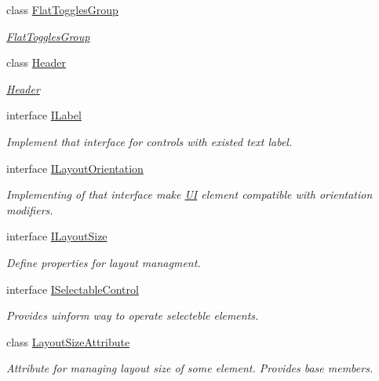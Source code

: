 \begin{DoxyCompactItemize}
class \mbox{\hyperlink{class_wpf_handler_1_1_u_i_1_1_controls_1_1_flat_toggles_group}{Flat\+Toggles\+Group}}
\begin{DoxyCompactList}\small\item\em \mbox{\hyperlink{class_wpf_handler_1_1_u_i_1_1_controls_1_1_flat_toggles_group}{Flat\+Toggles\+Group}} \end{DoxyCompactList}\item 
class \mbox{\hyperlink{class_wpf_handler_1_1_u_i_1_1_controls_1_1_header}{Header}}
\begin{DoxyCompactList}\small\item\em \mbox{\hyperlink{class_wpf_handler_1_1_u_i_1_1_controls_1_1_header}{Header}} \end{DoxyCompactList}\item 
interface \mbox{\hyperlink{interface_wpf_handler_1_1_u_i_1_1_controls_1_1_i_label}{I\+Label}}
\begin{DoxyCompactList}\small\item\em Implement that interface for controls with existed text label. \end{DoxyCompactList}\item 
interface \mbox{\hyperlink{interface_wpf_handler_1_1_u_i_1_1_controls_1_1_i_layout_orientation}{I\+Layout\+Orientation}}
\begin{DoxyCompactList}\small\item\em Implementing of that interface make \mbox{\hyperlink{namespace_wpf_handler_1_1_u_i}{UI}} element compatible with orientation modifiers. \end{DoxyCompactList}\item 
interface \mbox{\hyperlink{interface_wpf_handler_1_1_u_i_1_1_controls_1_1_i_layout_size}{I\+Layout\+Size}}
\begin{DoxyCompactList}\small\item\em Define properties for layout managment. \end{DoxyCompactList}\item 
interface \mbox{\hyperlink{interface_wpf_handler_1_1_u_i_1_1_controls_1_1_i_selectable_control}{I\+Selectable\+Control}}
\begin{DoxyCompactList}\small\item\em Provides uinform way to operate selecteble elements. \end{DoxyCompactList}\item 
class \mbox{\hyperlink{class_wpf_handler_1_1_u_i_1_1_controls_1_1_layout_size_attribute}{Layout\+Size\+Attribute}}
\begin{DoxyCompactList}\small\item\em Attribute for managing layout size of some element. Provides base members. \end{DoxyCompactList}\item 

\end{DoxyCompactItemize}
